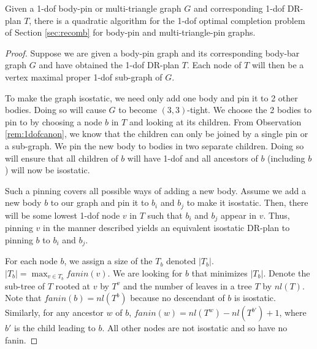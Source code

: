 \begin{figure}
\end{figure}

\begin{theorem}
\label{thm:1dofcase}
    Given a 1-dof body-pin or multi-triangle graph $G$ and corresponding 1-dof DR-plan $T$, there is a quadratic algorithm for the 1-dof optimal completion problem of Section \ref{sec:recomb} for body-pin and multi-triangle-pin graphs.
\end{theorem}

\begin{proof}
    Suppose we are given a body-pin graph and its corresponding body-bar graph $G$ and have obtained the 1-dof DR-plan $T$. Each node of $T$ will then be a vertex maximal proper 1-dof sub-graph of $G$.

    To make the graph isostatic, we need only add one body and pin it to 2 other bodies. Doing so will cause $G$ to become $(3,3)$-tight. We choose the 2 bodies to pin to by choosing a node $b$ in $T$ and looking at its children. From Observation \ref{rem:1dofcanon}, we know that the children can only be joined by a single pin or a sub-graph. We pin the new body to bodies in two separate children. Doing so will ensure that all children of $b$ will have 1-dof and all ancestors of $b$ (including $b$) will now be isostatic.


    Such a pinning covers all possible ways of adding a new body. Assume we add a new body $b$ to our graph and pin it to $b_i$ and $b_j$ to make it isostatic. Then, there will be some lowest 1-dof node $v$ in $T$ such that $b_i$ and $b_j$ appear in $v$. Thus, pinning $v$ in the manner described yields an equivalent isostatic DR-plan to pinning $b$ to $b_i$ and $b_j$.

    For each node $b$, we assign a size of the $T_b$ denoted $|T_b|$. $|T_b| = \displaystyle\max_{v \in T_b} fanin(v)$. We are looking for $b$ that minimizes $|T_b|$. Denote the sub-tree of $T$ rooted at $v$ by $T^v$ and the number of leaves in a tree $T$ by $nl(T)$. Note that $fanin(b)= nl(T^b)$ because no descendant of $b$ is isostatic. Similarly, for any ancestor $w$ of $b$, $fanin(w) = nl(T^w)-nl(T^{b'})+1$, where $b'$ is the child leading to $b$. All other nodes are not isostatic and so have no fanin.


\end{proof}
